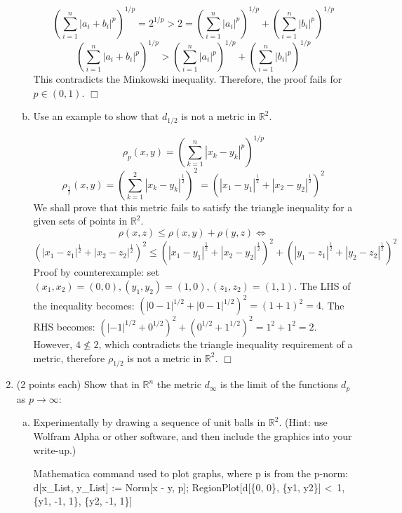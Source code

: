\documentclass[12pt,letterpaper,reqno]{amsart}
\newcommand{\R}{\mathbb R}
\begin{document}
\begin{enumerate}[1.]
\begin{enumerate}[(a)]
\begin{flushleft}
$$ \left(\sum\limits_{i=1}^n |a_i + b_i|^p\right)^{1/p} = 2^{1/p} > 2 = \left(\sum\limits_{i=1}^n |a_i|^p\right)^{1/p} + \left(\sum\limits_{i=1}^n |b_i|^p\right)^{1/p}  $$
$$ \left(\sum\limits_{i=1}^n |a_i + b_i|^p\right)^{1/p} > \left(\sum\limits_{i=1}^n |a_i|^p\right)^{1/p} + \left(\sum\limits_{i=1}^n |b_i|^p\right)^{1/p}$$
This contradicts the Minkowski inequality. Therefore, the proof fails for $p\in (0,1)$. $\Box$
\end{flushleft}
\newpage
\item Use an example to show that $d_{1/2}$ is not a metric in $\R^2$.
\begin{flushleft}
$$\rho_p (x,y) = (\sum\limits_{k=1}^n |x_k - y_k|^p)^{1/p}$$
$$\rho_{\frac{1}{2}} (x,y) = (\sum\limits_{k=1}^2 |x_k - y_k|^{\frac{1}{2}})^2 = (|x_1 - y_1|^{\frac{1}{2}} + |x_2 - y_2|^{\frac{1}{2}})^2$$
We shall prove that this metric fails to satisfy the triangle inequality for a given sets of points in $\R^2$.
$$\rho(x,z) \leq \rho(x,y) + \rho(y,z) \Leftrightarrow$$
$$(|x_1 - z_1|^{\frac{1}{2}} + |x_2 - z_2|^{\frac{1}{2}})^2 \leq (|x_1 - y_1|^{\frac{1}{2}} + |x_2 - y_2|^{\frac{1}{2}})^2 + (|y_1 - z_1|^{\frac{1}{2}} + |y_2 - z_2|^{\frac{1}{2}})^2$$
Proof by counterexample: set $(x_1, x_2) = (0,0), (y_1, y_2) = (1,0), (z_1, z_2) = (1,1)$. The LHS of the inequality becomes: $(|0-1|^{1/2} + |0-1|^{1/2})^2 = (1+1)^2 = 4$. \newline
The RHS becomes: $(|-1|^{1/2} + 0^{1/2})^2 + (0^{1/2}+1^{1/2})^2 = 1^2 + 1^2 = 2$. \newline
However, $ 4 \not\leq 2$, which contradicts the triangle inequality requirement of a metric, therefore $\rho_{1/2}$ is not a metric in $\R^2$. $\Box$
\end{flushleft}
\end{enumerate}

\item (2 points each) Show that in $\R^n$ the metric $d_\infty$ is the limit of the functions $d_p$ as $p\rightarrow \infty$:
\begin{enumerate}[(a)]
\item Experimentally by drawing a sequence of unit balls in $\R^2$. (Hint: use Wolfram Alpha or other software, and then include the graphics into your write-up.)\newline
\begin{flushleft}
Mathematica command used to plot graphs, where p is from the p-norm:\newline
d[x\_List, y\_List] := Norm[x - y, p]; \newline
RegionPlot[d[\{0, 0\}, \{y1, y2\}] \textless\, 1, \{y1, -1, 1\}, \{y2, -1, 1\}]
\end{flushleft}


\end{enumerate}
\end{enumerate}
\end{document}
